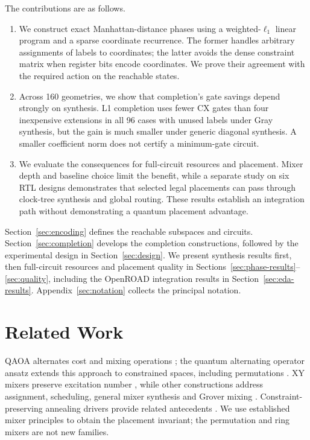 \documentclass[manuscript,screen,review]{acmart}
\begin{document}
The contributions are as follows.
\begin{enumerate}
\item We construct exact Manhattan-distance phases using a weighted-$\ell_1$
linear program and a sparse coordinate recurrence. The former handles
arbitrary assignments of labels to coordinates; the latter avoids the dense
constraint matrix when register bits encode coordinates. We prove their
agreement with the required action on the reachable states.
\item Across 160 geometries, we show that completion's gate savings depend
strongly on synthesis. L1 completion uses fewer CX gates than four
inexpensive extensions in all 96 cases with unused labels under Gray
synthesis, but the gain is much smaller under generic diagonal synthesis. A smaller coefficient norm does
not certify a minimum-gate circuit.
\item We evaluate the consequences for full-circuit resources and placement.
Mixer depth and baseline choice limit the benefit, while a separate study
on six RTL designs demonstrates that selected legal placements can pass
through clock-tree synthesis and global routing. These results establish
an integration path without demonstrating a quantum placement advantage.
\end{enumerate}

Section~\ref{sec:encoding} defines the reachable subspaces and circuits.
Section~\ref{sec:completion} develops the completion constructions, followed
by the experimental design in Section~\ref{sec:design}. We present synthesis
results first, then full-circuit resources and placement quality in
Sections~\ref{sec:phase-results}--\ref{sec:quality}, including the OpenROAD
integration results in Section~\ref{sec:eda-results}.
Appendix~\ref{sec:notation} collects the principal notation.

\section{Related Work}
QAOA alternates cost and mixing operations \cite{farhi2014qaoa}; the quantum
alternating operator ansatz extends this approach to constrained spaces,
including permutations \cite{hadfield2019qaoa}. XY mixers preserve excitation
number \cite{wang2019xymixers}, while other constructions address assignment,
scheduling, general mixer synthesis and Grover mixing
\cite{stollenwerk2020planning,palackal2024permutation,fuchs2022mixers,bartschi2020grover}.
Constraint-preserving annealing drivers provide related antecedents
\cite{hen2016constrained}. We use established mixer principles to obtain the
placement invariant; the permutation and ring mixers are not new families.
\end{document}
